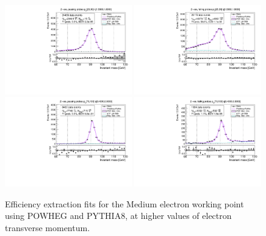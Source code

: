 {\begin{figure}
\centering
\includegraphics[width=0.49\textwidth]{figures/Zee_PowhegPythia_BkgLPiEMu_pass_ptBin3_etaBin23.pdf}
\includegraphics[width=0.49\textwidth]{figures/Zee_PowhegPythia_BkgLPiEMu_fail_ptBin3_etaBin23.pdf}
\includegraphics[width=0.49\textwidth]{figures/Zee_PowhegPythia_BkgLPiEMu_pass_ptBin14_etaBin17.pdf}
\includegraphics[width=0.49\textwidth]{figures/Zee_PowhegPythia_BkgLPiEMu_fail_ptBin14_etaBin17.pdf}
\caption{Efficiency extraction fits for the Medium electron working point using POWHEG and PYTHIA8, at higher values of electron transverse momentum.}
\label{fig:ZeeAltSigFSRFits2}
\end{figure}
\begin{figure}
\centering

\end{figure}}
